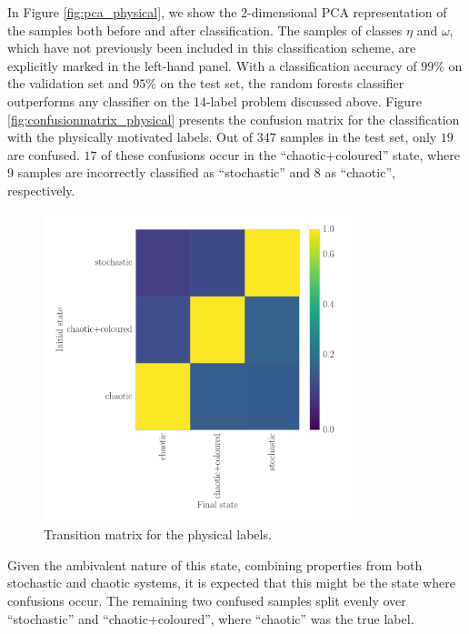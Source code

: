 \documentclass[12pt]{emulateapj}
\begin{document}
In Figure \ref{fig:pca_physical}, we show the 2-dimensional PCA representation of the samples both before and after classification. The samples of classes $\eta$ and $\omega$, which have not previously been included in this classification scheme, are explicitly marked in the left-hand panel. 
With a classification accuracy of $99\%$ on the validation set and $95\%$ on the test set, the random forests classifier outperforms any classifier on the 14-label problem discussed above. Figure \ref{fig:confusionmatrix_physical} presents the confusion matrix for the classification with the physically motivated labels.
Out of $347$ samples in the test set, only $19$ are confused. $17$ of these confusions occur in the ``chaotic+coloured'' state, where $9$ samples are incorrectly 
classified as ``stochastic'' and $8$ as ``chaotic'', respectively. 
\begin{figure}[htbp]
\begin{center}
\includegraphics[width=9cm]{grs1915_supervised_phys_transmat.pdf}
\caption{Transition matrix for the physical labels.} 
\label{fig:transmat_phys}
\end{center}
\end{figure}
Given the ambivalent nature of this state, combining properties from both stochastic and chaotic systems, it is expected that this might be the state where confusions occur. The remaining two confused samples split evenly over ``stochastic'' and ``chaotic+coloured'', where ``chaotic'' was the true label.
\end{document}
